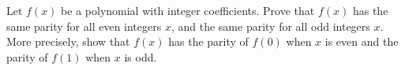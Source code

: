 Let $f(x)$ be a polynomial with integer coefficients. Prove that $f(x)$ has the same parity for all even integers $x$, and the same parity for all odd integers $x$. More precisely, show that $f(x)$ has the parity of $f(0)$ when $x$ is even and the parity of $f(1)$ when $x$ is odd.
